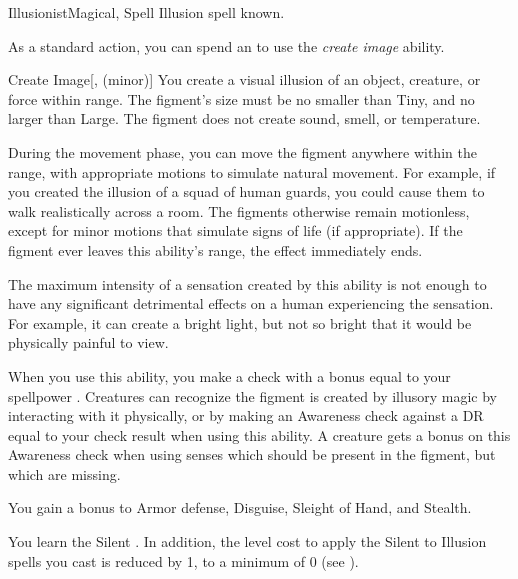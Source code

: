     \begin{feat}{Illusionist}{Magical, Spell}
        \featpre Illusion spell known.

         As a standard action, you can spend an  to use the \textit{create image} ability.
        \begin{ability}{Create Image}[,  (minor)]
            You create a visual illusion of an object, creature, or force within \rngmed range.
            The figment's size must be no smaller than Tiny, and no larger than Large.
            The figment does not create sound, smell, or temperature.

            During the movement phase, you can move the figment anywhere within the range, with appropriate motions to simulate natural movement.
            For example, if you created the illusion of a squad of human guards, you could cause them to walk realistically across a room.
            The figments otherwise remain motionless, except for minor motions that simulate signs of life (if appropriate).
            If the figment ever leaves this ability's range, the effect immediately ends.

            The maximum intensity of a sensation created by this ability is not enough to have any significant detrimental effects on a human experiencing the sensation.
            For example, it can create a bright light, but not so bright that it would be physically painful to view.

            When you use this ability, you make a check with a bonus equal to your spellpower .
            Creatures can recognize the figment is created by illusory magic by interacting with it physically, or by making an Awareness check against a DR equal to your check result when using this ability.
            A creature gets a  bonus on this Awareness check when using senses which should be present in the figment, but which are missing.
        \end{ability}

         You gain a  bonus to Armor defense, Disguise, Sleight of Hand, and Stealth.

         You learn the Silent .
        In addition, the level cost to apply the Silent  to Illusion spells you cast is reduced by 1, to a minimum of 0 (see ).


\end{feat}
